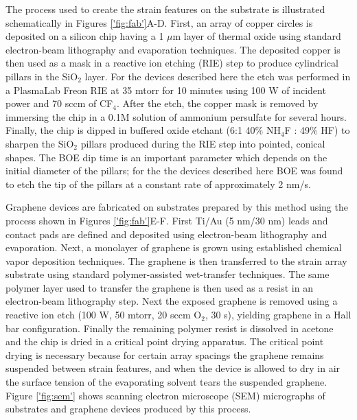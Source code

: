 \documentclass[%
 aip,
 apl,%
 amsmath,amssymb,
 reprint,%
]{revtex4-1}
\begin{document}
The process used to create the strain features on the substrate is illustrated schematically in Figures \ref{'fig:fab'}A-D.
First, an array of copper circles is deposited on a silicon chip having a 1 $\mu$m layer of thermal oxide using standard 
electron-beam lithography and evaporation techniques. The deposited copper is then used as a mask in a reactive ion etching 
(RIE) step to produce cylindrical pillars in the SiO$_2$ layer. For the devices described here the etch was performed in 
a PlasmaLab Freon RIE at 35 mtorr for 10 minutes 
using 100 W of incident power and 70 sccm of CF$_4$. After the etch, the copper mask is removed by immersing the chip 
in a 0.1M solution of ammonium persulfate for several hours. Finally, the chip is dipped in buffered oxide etchant 
(6:1 40\% NH$_4$F : 49\% HF) to sharpen the SiO$_2$ pillars produced during the RIE step into pointed, conical shapes. 
The BOE dip time is an important parameter which depends on the initial diameter of the pillars; for the the devices
described here BOE was found to etch the tip of the pillars at a constant rate of approximately 2 nm/s. 


Graphene devices are fabricated on substrates prepared by this method using the process shown in Figures \ref{'fig:fab'}E-F. 
First Ti/Au (5 nm/30 nm) leads and contact pads are defined and deposited using electron-beam lithography and evaporation. 
Next, a monolayer of graphene is grown using established chemical vapor deposition techniques\cite{Li2009}. 
The graphene is then transferred to the strain array substrate using standard polymer-assisted wet-transfer 
techniques\cite{li2009transfer}. The same polymer layer used to transfer the graphene is then used as a 
resist in an electron-beam lithography step. Next the exposed graphene is removed using a reactive ion etch 
(100 W, 50 mtorr, 20 sccm O$_2$, 30 s), yielding graphene in a Hall bar configuration. Finally the remaining 
polymer resist is dissolved in acetone and the chip is dried in a critical point drying apparatus. 
The critical point drying is necessary because for certain array spacings the graphene remains suspended between
strain features, and when the device is allowed to dry in air the surface tension 
of the evaporating solvent tears the suspended graphene.
Figure \ref{'fig:sem'} shows scanning electron microscope (SEM) micrographs of substrates and
graphene devices produced by this process.

\end{document}
